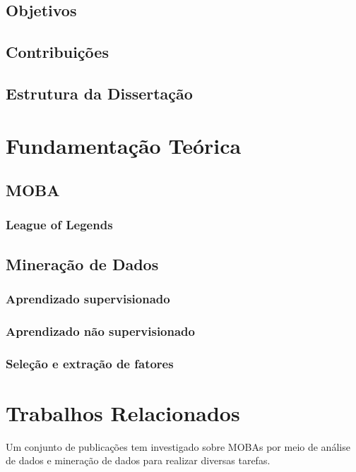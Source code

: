 \section{Objetivos}
\section{Contribuições}
\section{Estrutura da Dissertação}

\chapter{Fundamentação Teórica}
\section{MOBA}
\subsection{League of Legends}
\section{Mineração de Dados}
\subsection{Aprendizado supervisionado}
\subsection{Aprendizado não supervisionado}
\subsection{Seleção e extração de fatores}

\chapter{Trabalhos Relacionados}

Um conjunto de publicações tem investigado sobre MOBAs por meio de análise de dados e mineração de dados para realizar diversas tarefas.

